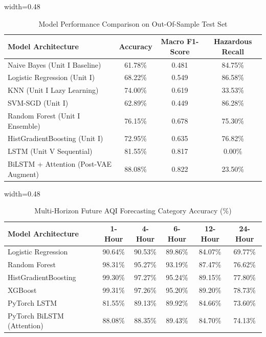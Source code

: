 \documentclass[conference]{IEEEtran}
\begin{document}
\begin{table}[htbp]
\caption{Model Performance Comparison on Out-Of-Sample Test Set}
\label{tab:performance}
\centering
\begin{adjustbox}{width=0.48\textwidth}
\begin{tabular}{lccc}
\toprule
\textbf{Model Architecture} & \textbf{Accuracy} & \textbf{Macro F1-Score} & \textbf{Hazardous Recall} \\
\midrule
Naive Bayes (Unit I Baseline) & 61.78\% & 0.481 & 84.75\% \\
Logistic Regression (Unit I) & 68.22\% & 0.549 & 86.58\% \\
KNN (Unit I Lazy Learning) & 74.00\% & 0.619 & 33.53\% \\
SVM-SGD (Unit I) & 62.89\% & 0.449 & 86.28\% \\
Random Forest (Unit I Ensemble) & 76.15\% & 0.678 & 75.30\% \\
HistGradientBoosting (Unit I) & 72.95\% & 0.635 & 76.82\% \\
LSTM (Unit V Sequential) & 81.55\% & 0.817 & 0.00\% \\
BiLSTM + Attention (Post-VAE Augment) & 88.08\% & 0.822 & 23.50\% \\
\bottomrule
\end{tabular}
\end{adjustbox}
\end{table}

\begin{table}[htbp]
\caption{Multi-Horizon Future AQI Forecasting Category Accuracy (\%)}
\label{tab:forecasting}
\centering
\begin{adjustbox}{width=0.48\textwidth}
\begin{tabular}{lccccc}
\toprule
\textbf{Model Architecture} & \textbf{1-Hour} & \textbf{4-Hour} & \textbf{6-Hour} & \textbf{12-Hour} & \textbf{24-Hour} \\
\midrule
Logistic Regression & 90.64\% & 90.53\% & 89.86\% & 84.07\% & 69.77\% \\
Random Forest & 98.31\% & 95.27\% & 93.19\% & 87.47\% & 76.62\% \\
HistGradientBoosting & 99.30\% & 97.27\% & 95.24\% & 89.15\% & 77.80\% \\
XGBoost & 99.31\% & 97.26\% & 95.20\% & 89.20\% & 78.73\% \\
PyTorch LSTM & 81.55\% & 89.13\% & 89.92\% & 84.66\% & 73.60\% \\
PyTorch BiLSTM (Attention) & 88.08\% & 88.35\% & 89.43\% & 84.70\% & 74.13\% \\
\bottomrule
\end{tabular}
\end{adjustbox}
\end{table}
\end{document}
